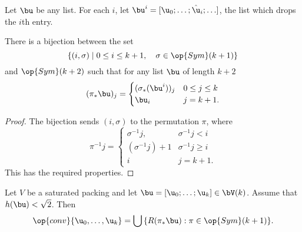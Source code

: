 \begin{definition}
Let $\bu$ be any list.
For each $i$,  let
$\bu^i = [\u_0;\ldots;\hat\u_i;\ldots]$, the list which drops the $i$th entry.
\end{definition}

\begin{lemma}[]\label{lemma:coset-bijection} 
There is a bijection between the set 
\begin{displaymath} 
\{(i,\sigma)\mid 0\le i\le k+1,\quad \sigma\in \op{Sym}(k+1)\}
\end{displaymath}
and $\op{Sym}(k+2)$ such that for any list $\bu$ of length $k+2$
\[
(\pi_*\bu)_j = \begin{cases} (\sigma_*(\bu^i))_j&0\le j \le k\\
  \bu_i & j=k+1.
\end{cases}
\]
\end{lemma}

\begin{proof} 
The bijection sends $(i,\sigma)$ to the permutation $\pi$, where
\begin{displaymath} 
\pi^{-1} j = \begin{cases} 
\sigma^{-1} j, & \sigma^{-1} j<i\\
(\sigma^{-1}j)+1 & \sigma^{-1} j \ge i\\
i& j=k+1.
\end{cases}
\end{displaymath}
This has the required properties.
\end{proof}

\begin{lemma}[]\label{lemma:Rconv}  
  Let $V$ be a saturated packing and let $\bu = [\u_0;\ldots;\u_k]\in
  \bV(k)$.  Assume that $h(\bu)<\sqrt2$.  
  Then
\begin{displaymath} 
\op{conv}\{ \u_0,\ldots, \u_k\} = \bigcup \,\{ R(\pi_*\bu) : \pi\in \op{Sym}(k+1)\}.
\end{displaymath}
\end{lemma}
%

